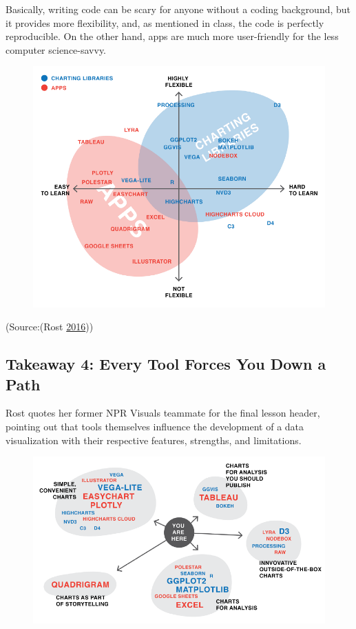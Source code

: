 \documentclass[]{book}
\theoremstyle{definition}
\theoremstyle{definition}
\theoremstyle{definition}
\theoremstyle{remark}
\begin{document}
Basically, writing code can be scary for anyone without a coding
background, but it provides more flexibility, and, as mentioned in
class, the code is perfectly reproducible. On the other hand, apps are
much more user-friendly for the less computer science-savvy.

\begin{figure}
\centering
\includegraphics{images/apps_vs_code.png}
\caption{}
\end{figure}

(Source:(Rost \protect\hyperlink{ref-different_tools}{2016}))

\subsection{Takeaway 4: Every Tool Forces You Down a
Path}\label{takeaway-4-every-tool-forces-you-down-a-path}

Rost quotes her former NPR Visuals teammate for the final lesson header,
pointing out that tools themselves influence the development of a data
visualization with their respective features, strengths, and
limitations.

\begin{figure}
\centering
\includegraphics{images/tools_force_paths.png}
\caption{}
\end{figure}
\end{document}

